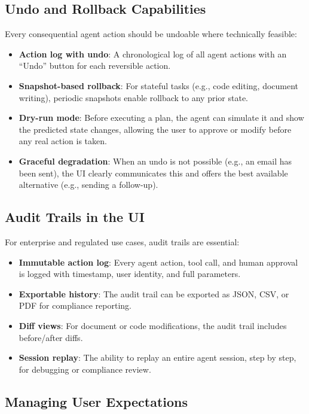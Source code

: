 \subsection{Undo and Rollback Capabilities}
\label{undo-and-rollback-capabilities}

Every consequential agent action should be undoable where technically feasible:

\begin{itemize}
  \item \textbf{Action log with undo}: A chronological log of all agent actions with an ``Undo'' button for each reversible action.
  \item \textbf{Snapshot-based rollback}: For stateful tasks (e.g., code editing, document writing), periodic snapshots enable rollback to any prior state.
  \item \textbf{Dry-run mode}: Before executing a plan, the agent can simulate it and show the predicted state changes, allowing the user to approve or modify before any real action is taken.
  \item \textbf{Graceful degradation}: When an undo is not possible (e.g., an email has been sent), the UI clearly communicates this and offers the best available alternative (e.g., sending a follow-up).
\end{itemize}

\subsection{Audit Trails in the UI}
\label{audit-trails-in-the-ui}

For enterprise and regulated use cases, audit trails are essential:

\begin{itemize}
  \item \textbf{Immutable action log}: Every agent action, tool call, and human approval is logged with timestamp, user identity, and full parameters.
  \item \textbf{Exportable history}: The audit trail can be exported as JSON, CSV, or PDF for compliance reporting.
  \item \textbf{Diff views}: For document or code modifications, the audit trail includes before/after diffs.
  \item \textbf{Session replay}: The ability to replay an entire agent session, step by step, for debugging or compliance review.
\end{itemize}

\subsection{Managing User Expectations}
\label{managing-user-expectations}

